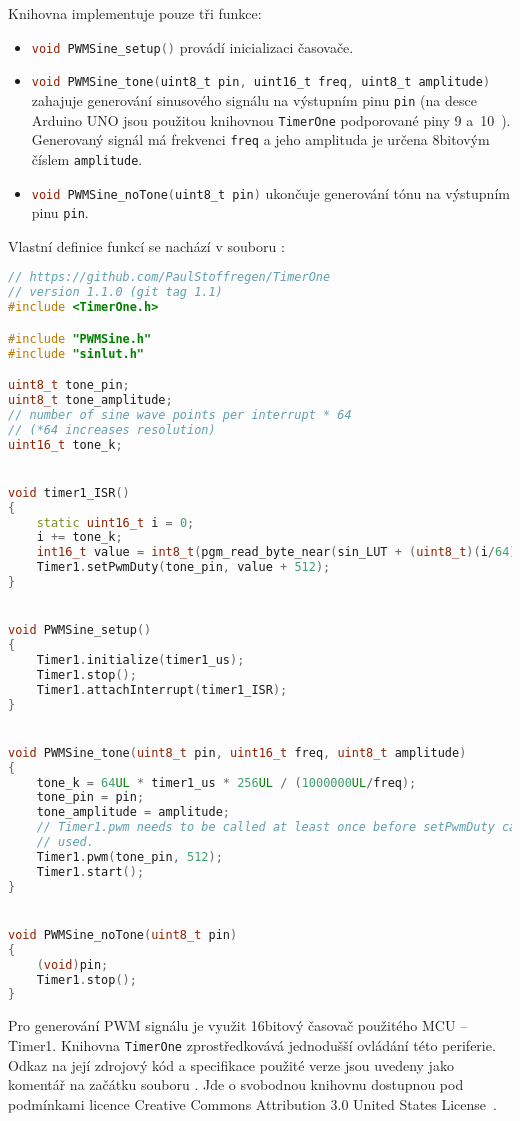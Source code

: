 Knihovna implementuje pouze tři funkce:
\begin{itemize}[nosep]
    \item \lstinline[language=C]!void PWMSine_setup()! provádí inicializaci časovače.

    \item \lstinline[language=C]!void PWMSine_tone(uint8_t pin, uint16_t freq, uint8_t amplitude)!
        zahajuje generování sinusového signálu na výstupním pinu \texttt{pin}
        (na desce Arduino UNO jsou použitou knihovnou \texttt{TimerOne}
        podporované piny 9 a~10~\cite{TimerOnedocs}). Generovaný signál má
        frekvenci \texttt{freq} a jeho amplituda je určena 8bitovým číslem
        \texttt{amplitude}.

    \item \lstinline[language=C]!void PWMSine_noTone(uint8_t pin)!
        ukončuje generování tónu na výstupním pinu \texttt{pin}.
\end{itemize}

Vlastní definice funkcí se nachází v souboru :
\begin{lstlisting}[language=C++,style=numbers]
// https://github.com/PaulStoffregen/TimerOne
// version 1.1.0 (git tag 1.1)
#include <TimerOne.h>

#include "PWMSine.h"
#include "sinlut.h"

uint8_t tone_pin;
uint8_t tone_amplitude;
// number of sine wave points per interrupt * 64
// (*64 increases resolution)
uint16_t tone_k;


void timer1_ISR()
{
    static uint16_t i = 0;
    i += tone_k;
    int16_t value = int8_t(pgm_read_byte_near(sin_LUT + (uint8_t)(i/64))) * tone_amplitude / 64;
    Timer1.setPwmDuty(tone_pin, value + 512);
}


void PWMSine_setup()
{
    Timer1.initialize(timer1_us);
    Timer1.stop();
    Timer1.attachInterrupt(timer1_ISR);
}


void PWMSine_tone(uint8_t pin, uint16_t freq, uint8_t amplitude)
{
    tone_k = 64UL * timer1_us * 256UL / (1000000UL/freq);
    tone_pin = pin;
    tone_amplitude = amplitude;
    // Timer1.pwm needs to be called at least once before setPwmDuty can be
    // used.
    Timer1.pwm(tone_pin, 512);
    Timer1.start();
}


void PWMSine_noTone(uint8_t pin)
{
    (void)pin;
    Timer1.stop();
}
\end{lstlisting}

Pro generování PWM signálu je využit 16bitový časovač použitého MCU -- Timer1.
Knihovna \texttt{TimerOne} zprostředkovává jednodušší ovládání této periferie.
Odkaz na její zdrojový kód a specifikace použité verze jsou uvedeny jako
komentář na začátku souboru . Jde o svobodnou knihovnu
dostupnou pod podmínkami licence
\foreignlanguage{english}{Creative Commons Attribution 3.0 United States
License}~\cite{TimerOnerepo}.

